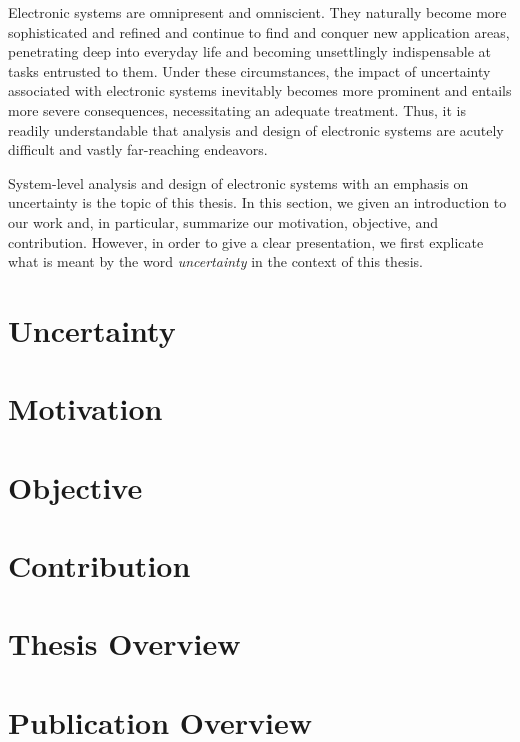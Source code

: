 Electronic systems are omnipresent and omniscient. They naturally become more
sophisticated and refined and continue to find and conquer new application
areas, penetrating deep into everyday life and becoming unsettlingly
indispensable at tasks entrusted to them. Under these circumstances, the impact
of uncertainty associated with electronic systems inevitably becomes more
prominent and entails more severe consequences, necessitating an adequate
treatment. Thus, it is readily understandable that analysis and design of
electronic systems are acutely difficult and vastly far-reaching endeavors.

System-level analysis and design of electronic systems with an emphasis on
uncertainty is the topic of this thesis. In this section, we given an
introduction to our work and, in particular, summarize our motivation,
objective, and contribution. However, in order to give a clear presentation, we
first explicate what is meant by the word \emph{uncertainty} in the context of
this thesis.

\section{Uncertainty}

\section{Motivation}

\section{Objective}

\section{Contribution}

\section{\priortitle}

\section{Thesis Overview}

\section{Publication Overview}

